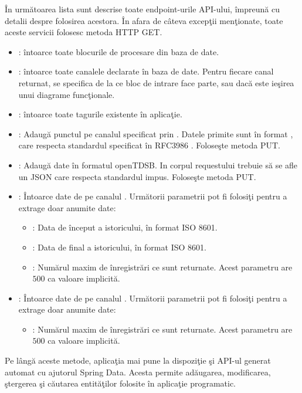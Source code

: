 În următoarea lista sunt descrise toate endpoint-urile API-ului, împreună cu detalii despre folosirea acestora. În afara de câteva excepţii menţionate, toate aceste servicii folosesc metoda HTTP GET.
\begin{itemize}
	\item {}: întoarce toate blocurile de procesare din baza de date. 
	\item {}: întoarce toate canalele declarate în baza de date. Pentru fiecare canal returnat, se specifica de la ce bloc de intrare face parte, sau dacă este ieşirea unui diagrame funcţionale.
	\item {}: întoarce toate tagurile existente în aplicaţie.
	\item {}: Adaugă punctul  pe canalul specificat prin . Datele primite sunt în format , care respecta standardul specificat în RFC3986 \autocite{rfc3986}. Foloseşte metoda PUT.
	\item {}: Adaugă date în formatul openTDSB\autocite{openTSDB}. In corpul requestului trebuie să se afle un JSON care respecta standardul impus. Foloseşte metoda PUT.
	\item {}: Întoarce date de pe canalul . Următorii parametrii pot fi folosiţi pentru a extrage doar anumite date:
	\begin{itemize}
		\item {}: Data de început a istoricului, în format ISO 8601.
		\item {}: Data de final a istoricului, în format ISO 8601.
		\item {}: Numărul maxim de înregistrări ce sunt returnate. Acest parametru are $500$ ca valoare implicită.
	\end{itemize}
	\item {}: Întoarce date de pe canalul . Următorii parametrii pot fi folosiţi pentru a extrage doar anumite date:
	\begin{itemize}
		\item {}: Numărul maxim de înregistrări ce sunt returnate. Acest parametru are $500$ ca valoare implicită.
	\end{itemize}
\end{itemize}
Pe lângă aceste metode, aplicaţia mai pune la dispoziţie şi API-ul generat automat cu ajutorul Spring Data. Acesta permite adăugarea, modificarea, ştergerea şi căutarea entităţilor folosite în aplicaţie programatic.

